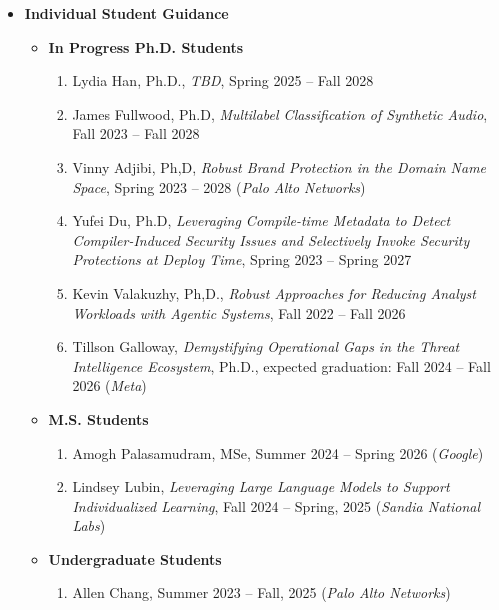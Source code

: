 \documentclass[11pt]{article}
\newcommand{\bibgap}{\vspace{0.3\baselineskip}}
\begin{document}
\begin{itemize}
\bibgap
\item {\bf Individual Student Guidance}

\begin{itemize}
\item {\bf In Progress Ph.D. Students}
\begin{enumerate}
	\item Lydia Han, Ph.D., {\it TBD}, Spring 2025 --  Fall 2028
	\item James Fullwood, Ph.D, {\it Multilabel Classification of Synthetic Audio}, Fall 2023 -- Fall 2028
	\item Vinny Adjibi, Ph,D, {\it Robust Brand Protection in the Domain Name Space}, Spring 2023 -- 2028 ({\it Palo Alto Networks})
	\item Yufei Du, Ph.D, {\it Leveraging Compile-time Metadata to Detect Compiler-Induced Security Issues and Selectively Invoke Security Protections at Deploy Time}, Spring 2023 -- Spring 2027
	\item Kevin Valakuzhy, Ph,D., {\it Robust Approaches for Reducing  Analyst Workloads with Agentic Systems}, Fall 2022 -- Fall 2026
	\item Tillson Galloway,  {\it Demystifying Operational Gaps in the Threat Intelligence Ecosystem}, Ph.D., expected graduation: Fall 2024 -- Fall 2026 ({\it Meta})
\end{enumerate}



\bibgap
\item  {\bf M.S. Students}
\begin{enumerate}[resume]
	\item Amogh Palasamudram, MSe, Summer 2024 -- Spring 2026 ({\it Google})
	\item Lindsey Lubin, {\it Leveraging Large Language Models to Support Individualized Learning}, Fall 2024 -- Spring, 2025 ({\it Sandia National Labs}) 
\end{enumerate}

\bibgap
\item {\bf Undergraduate Students}
\begin{enumerate}[resume]
\item Allen Chang, Summer 2023 -- Fall, 2025 ({\it Palo Alto Networks})
\end{enumerate}


\end{itemize}
\end{itemize}
\end{document}
